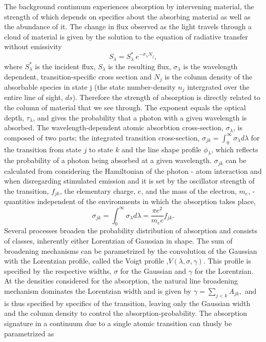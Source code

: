 \documentclass[a4paper,fleqn,usenatbib]{mnras}
\begin{document}
The background continuum experiences absorption by intervening material, the
strength of which depends on specifics about the absorbing material as well as
the abundance of it. The change in flux observed as the light travels through a
cloud of material is given by the solution to the equation of radiative transfer without emissivity
\begin{equation}
S_\lambda = S_\lambda^* \  e^{ - \sigma_{\lambda} N_j}, 
\end{equation} 
where $S_\lambda^*$ is the incident flux, $S_\lambda$ is the resulting flux,
$\sigma_{\lambda}$ is the wavelength dependent, transition-specific cross
section and $N_j$ is the column density of the absorbable species in state j 
(the state number-density $n_j$ intergrated over the entire line of sight,
$ds$). Therefore the strength of absorption is directly related to the column of
material that we see through. The exponent equals the optical depth,
$\tau_\lambda$, and gives the probability that a photon with a given wavelength
is absorbed. The wavelength-dependent atomic absorbtion cross-section,
$\sigma_{\lambda}$, is composed of two parts; the integrated transition
cross-section, $\sigma_{jk} = \int_{0}^{\infty} \sigma_{\lambda} d\lambda$ for
the transition from state $j$ to state $k$ and the line shape profile $\phi_\lambda$,
which reflects the probability of a photon being absorbed at a given wavelength.
$\sigma_{jk}$ can be calculated from considering the Hamiltonian of the photon -
atom interaction and when disregarding stimulated emission and it is set by the
oscillator strength of the transition, $f_{jk}$, the elementary charge, $e$, and the mass of
the electron, $m_e$, - quantities independent of the environments in which the
absorption takes place,
\begin{equation} 
\sigma_{jk} = \int_{0}^{\infty} \sigma_{\lambda} d\lambda = \frac{\pi  e^2}{m_e c} f_{jk}.
 \end{equation}
Several processes broaden the probability distribution of absorption and
consists of classes, inherently either Lorentzian of Gaussian in shape. The sum
of broadening mechanisms can be parametrized by the convolution of the Gaussian
with the Lorentzian profile, called the Voigt profile ,$V(\lambda, \sigma,
\gamma)$. This profile is specified by the respective widths, $\sigma$ for the
Gaussian and $\gamma$ for the Lorentzian. At the densities considered for the
absorption, the natural line broadening mechanism dominates the Lorentzian width
and is given by $\gamma = \sum\limits_{j<k} A_{jk},$ and is thus specified by
specifics of the transition, leaving only the Gaussian width and the column
density to control the absorption-probability. The absorption signature in a
continuum due to a single atomic transition can thusly be parametrized as
\end{document}
